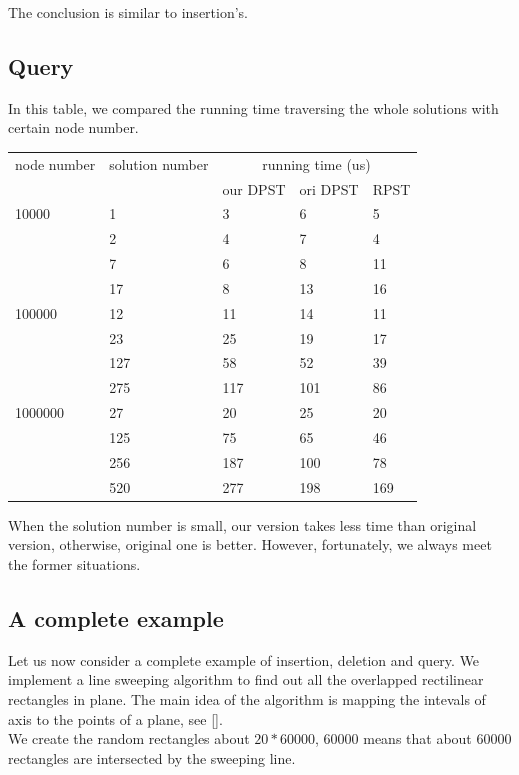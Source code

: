 \documentclass{acm_proc_article-sp}
\begin{document}
The conclusion is similar to insertion's.
\subsection{Query}
In this table, we compared the running time traversing the whole
solutions with certain node number.

\begin{table}[ht]
\begin{tabular}{|p{1.2cm}|p{1.1cm}|p{1.1cm}|p{1.1cm}|p{1.1cm}|}
\hline node number & solution number & \multicolumn{3}{|c|}{running time (us)}\\
\cline{3-5}
    && our DPST & ori DPST & RPST\\
\hline 10000 & 1 & 3 & 6 & 5\\
\cline{2-5}      & 2 & 4 & 7  & 4\\
\cline{2-5}      & 7 & 6 & 8 & 11\\
\cline{2-5}      & 17 & 8 & 13 & 16\\
\hline 100000 & 12 & 11 & 14 & 11\\
\cline{2-5}      & 23 & 25 & 19  & 17\\
\cline{2-5}      & 127 & 58 & 52 & 39\\
\cline{2-5}      & 275 & 117 & 101 & 86\\
\hline 1000000 & 27 & 20 & 25 & 20\\
\cline{2-5}      & 125 & 75 & 65  & 46\\
\cline{2-5}      & 256 & 187 & 100 & 78\\
\cline{2-5}      & 520 & 277 & 198 & 169\\
\hline
\end{tabular}
\end{table}

When the solution number is small, our version takes less time than
original version, otherwise, original one is better. However, fortunately, we always meet the former situations.

\subsection{A complete example}
Let us now consider a complete example of insertion, deletion and
query. We implement a line sweeping algorithm to find out all the
overlapped rectilinear rectangles in plane. The main idea of the algorithm is mapping the intevals of axis to the points of a plane, see [].\\
We create the random rectangles about $20*60000$, 60000 means that about 60000 rectangles are intersected by the sweeping line.\\
\end{document}
